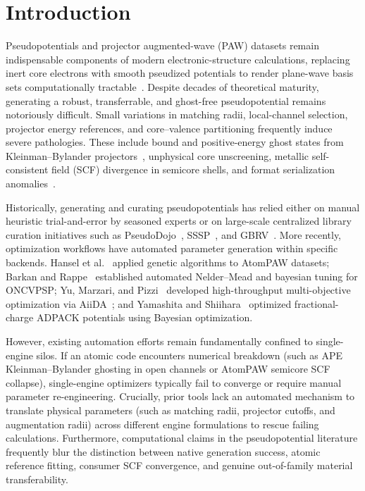 \documentclass[3p,twocolumn]{elsarticle}
\begin{document}
\section{Introduction}

Pseudopotentials and projector augmented-wave (PAW) datasets remain indispensable components of modern electronic-structure calculations, replacing inert core electrons with smooth pseudized potentials to render plane-wave basis sets computationally tractable~\cite{oncv,uspp,paw}. Despite decades of theoretical maturity, generating a robust, transferrable, and ghost-free pseudopotential remains notoriously difficult. Small variations in matching radii, local-channel selection, projector energy references, and core--valence partitioning frequently induce severe pathologies. These include bound and positive-energy ghost states from Kleinman--Bylander projectors~\cite{kb,dojo}, unphysical core unscreening, metallic self-consistent field (SCF) divergence in semicore shells, and format serialization anomalies~\cite{garcia}.

Historically, generating and curating pseudopotentials has relied either on manual heuristic trial-and-error by seasoned experts or on large-scale centralized library curation initiatives such as PseudoDojo~\cite{dojo}, SSSP~\cite{sssp,bosoni2024}, and GBRV~\cite{gbrv}. More recently, optimization workflows have automated parameter generation within specific backends. Hansel et al.~\cite{hansel} applied genetic algorithms to AtomPAW datasets; Barkan and Rappe~\cite{barkan2024} established automated Nelder--Mead and bayesian tuning for ONCVPSP; Yu, Marzari, and Pizzi~\cite{yu2024} developed high-throughput multi-objective optimization via AiiDA~\cite{aiida}; and Yamashita and Shiihara~\cite{yamashita2026} optimized fractional-charge ADPACK potentials using Bayesian optimization.

However, existing automation efforts remain fundamentally confined to single-engine silos. If an atomic code encounters numerical breakdown (such as APE Kleinman--Bylander ghosting in open channels or AtomPAW semicore SCF collapse), single-engine optimizers typically fail to converge or require manual parameter re-engineering. Crucially, prior tools lack an automated mechanism to translate physical parameters (such as matching radii, projector cutoffs, and augmentation radii) across different engine formulations to rescue failing calculations. Furthermore, computational claims in the pseudopotential literature frequently blur the distinction between native generation success, atomic reference fitting, consumer SCF convergence, and genuine out-of-family material transferability.
\end{document}
